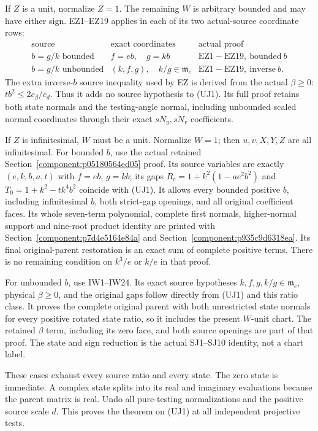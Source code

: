 If $Z$ is a unit, normalize $Z=1$. The remaining $W$ is arbitrary
bounded and may have either sign. EZ1--EZ19 applies in each of
its two actual-source coordinate rows:
\[
\begin{array}{c|c|c}
 \text{source}&\text{exact coordinates}&\text{actual proof}\\ \hline
 b=g/k\text{ bounded}& f=eb,\quad g=kb&
                     \mathrm{EZ1\!-\!EZ19,\ bounded\ }b\\
 b=g/k\text{ unbounded}&
        (k,f,g),\quad k/g\in\mathfrak m_c&
                     \mathrm{EZ1\!-\!EZ19,\ inverse\ }b.
\end{array}                                                     \tag{UJ5}
\]
The extra inverse-$b$ source inequality used by EZ is derived from
the actual $\beta\geq0$: $tb^2\leq2c_\beta/c_d$. Thus it adds no
source hypothesis to (UJ1). Its full proof retains both state
normals and the testing-angle normal, including unbounded scaled
normal coordinates through their exact $sN_y,sN_v$ coefficients.

If $Z$ is infinitesimal, $W$ must be a unit. Normalize $W=1$;
then $u,v,X,Y,Z$ are all infinitesimal.
For bounded $b$, use the actual retained
Section~\ref{component:p05180564ed05} proof. Its source variables are exactly
$(e,k,b,a,t)$ with $f=eb$, $g=kb$; its gaps
$R_c=1+k^2(1-ae^2b^2)$ and
$T_0=1+k^2-tk^4b^2$ coincide with (UJ1).
It allows every bounded positive $b$, including infinitesimal $b$,
both strict-gap openings, and all original coefficient faces.
Its whole seven-term polynomial, complete first normals,
higher-normal support and nine-root product identity are printed
with Section~\ref{component:p7d4e5164e84a} and
Section~\ref{component:p935c9d6318ea}. Its final original-parent
restoration is an exact sum of complete positive terms.
There is no remaining condition on $k^3/e$ or $k/e$ in that proof.

For unbounded $b$, use IW1--IW24. Its exact source hypotheses
$k,f,g,k/g\in\mathfrak m_c$, physical $\beta\geq0$, and the
original gaps follow directly from (UJ1) and this ratio class.
It proves the complete original parent with both unrestricted
state normals for every positive rotated state ratio, so it
includes the present $W$-unit chart. The retained $\beta$ term,
including its zero face, and both source openings are part of
that proof. The state and sign reduction is the actual
SJ1--SJ10 identity, not a chart label.

These cases exhaust every source ratio and every state.
The zero state is immediate. A complex state splits into its
real and imaginary evaluations because the parent matrix is real.
Undo all pure-testing normalizations and the positive source
scale $d$. This proves the theorem on (UJ1) at all independent
projective tests.



